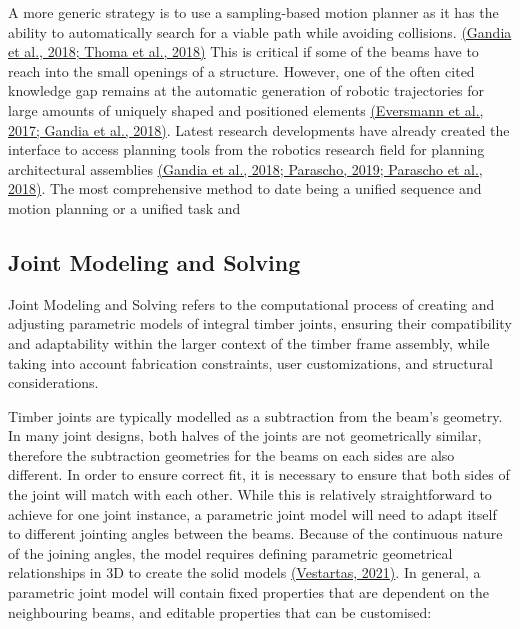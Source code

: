 \documentclass[11pt]{book}
\begin{document}
A more generic strategy is to use a sampling-based motion planner as it has the ability to automatically search for a viable path while avoiding collisions. \href{https://www.zotero.org/google-docs/?wxRkWx}{(Gandia et al., 2018; Thoma et al., 2018)} This is critical if some of the beams have to reach into the small openings of a structure. However, one of the often cited knowledge gap remains at the automatic generation of robotic trajectories for large amounts of uniquely shaped and positioned elements \href{https://www.zotero.org/google-docs/?COr7LA}{(Eversmann et al., 2017; Gandia et al., 2018)}. Latest research developments have already created the interface to access planning tools from the robotics research field for planning architectural assemblies \href{https://www.zotero.org/google-docs/?LW23oL}{(Gandia et al., 2018; Parascho, 2019; Parascho et al., 2018)}. The most comprehensive method to date being a unified sequence and motion planning or a unified task and 

\subsection{Joint Modeling and Solving}

Joint Modeling and Solving refers to the computational process of creating and adjusting parametric models of integral timber joints, ensuring their compatibility and adaptability within the larger context of the timber frame assembly, while taking into account fabrication constraints, user customizations, and structural considerations.

Timber joints are typically modelled as a subtraction from the beam’s geometry. In many joint designs, both halves of the joints are not geometrically similar, therefore the subtraction geometries for the beams on each sides are also different. In order to ensure correct fit, it is necessary to ensure that both sides of the joint will match with each other. While this is relatively straightforward to achieve for one joint instance, a parametric joint model will need to adapt itself to different jointing angles between the beams. Because of the continuous nature of the joining angles, the model requires defining parametric geometrical relationships in 3D to create the solid models \href{https://www.zotero.org/google-docs/?Ix4BkB}{(Vestartas, 2021)}. In general, a parametric joint model will contain fixed properties that are dependent on the neighbouring beams, and editable properties that can be customised:
\end{document}
